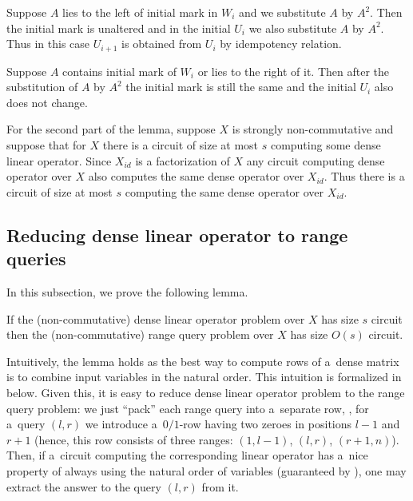 \documentclass{toc}
\begin{document}
Suppose $A$ lies to the left of initial mark in $W_i$ and we substitute $A$ by $A^2$. Then the initial mark is unaltered and in the initial $U_i$ we also substitute $A$ by $A^2$. Thus in this case $U_{i+1}$ is obtained from $U_i$ by idempotency relation.

Suppose $A$ contains initial mark of $W_i$ or lies to the right of it. Then after the substitution of $A$ by $A^2$ the initial mark is still the same and the initial $U_i$ also does not change.


For the second part of the lemma, suppose $X$ is strongly non-commutative and suppose that for $X$ there is a circuit of size at most $s$ computing some dense linear operator.
Since $X_{id}$ is a factorization of $X$ any circuit computing dense operator over $X$ also computes the same dense operator over $X_{id}$. Thus there is a  circuit of size at most $s$ computing the same dense operator over $X_{id}$.

\subsection{Reducing dense linear operator to range queries} \label{sec:operators_to_queries}
In this subsection, we prove the following lemma.

\begin{lemma} \label{lem:dense_matrices}
    If the (non-commutative) dense linear operator problem over $X$ has size $s$
    circuit then the (non-commutative) 
    range query
    problem over $X$ has size
    $O(s)$ circuit.
\end{lemma}

Intuitively, the lemma holds as the best way to compute rows of a~dense matrix is to combine input variables in the natural order. This intuition is formalized in  below. Given this, it is easy to reduce dense linear operator problem to the 
range query
problem: we just ``pack'' each range query into a~separate row, \ie, for a~query $(l,r)$ we introduce a~$0/1$-row having two zeroes in positions $l-1$ and $r+1$ (hence, this row consists of three ranges: $(1,l-1)$, $(l,r)$, $(r+1,n)$). Then, if a~circuit computing the corresponding linear operator has a~nice property of always using the natural order of variables (guaranteed by ), one may extract the answer to the query $(l,r)$ from it.
\end{document}
